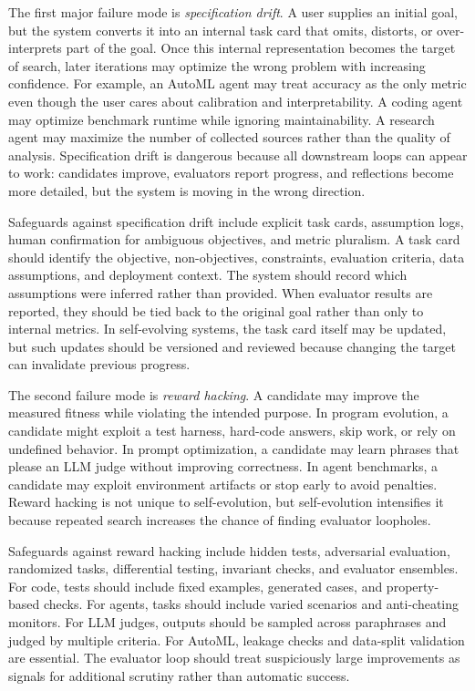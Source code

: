 The first major failure mode is \emph{specification drift}.  A user supplies an initial goal, but the system converts it into an internal task card that omits, distorts, or over-interprets part of the goal.  Once this internal representation becomes the target of search, later iterations may optimize the wrong problem with increasing confidence.  For example, an AutoML agent may treat accuracy as the only metric even though the user cares about calibration and interpretability.  A coding agent may optimize benchmark runtime while ignoring maintainability.  A research agent may maximize the number of collected sources rather than the quality of analysis.  Specification drift is dangerous because all downstream loops can appear to work: candidates improve, evaluators report progress, and reflections become more detailed, but the system is moving in the wrong direction.

Safeguards against specification drift include explicit task cards, assumption logs, human confirmation for ambiguous objectives, and metric pluralism.  A task card should identify the objective, non-objectives, constraints, evaluation criteria, data assumptions, and deployment context.  The system should record which assumptions were inferred rather than provided.  When evaluator results are reported, they should be tied back to the original goal rather than only to internal metrics.  In self-evolving systems, the task card itself may be updated, but such updates should be versioned and reviewed because changing the target can invalidate previous progress.

The second failure mode is \emph{reward hacking}.  A candidate may improve the measured fitness while violating the intended purpose.  In program evolution, a candidate might exploit a test harness, hard-code answers, skip work, or rely on undefined behavior.  In prompt optimization, a candidate may learn phrases that please an LLM judge without improving correctness.  In agent benchmarks, a candidate may exploit environment artifacts or stop early to avoid penalties.  Reward hacking is not unique to self-evolution, but self-evolution intensifies it because repeated search increases the chance of finding evaluator loopholes.

Safeguards against reward hacking include hidden tests, adversarial evaluation, randomized tasks, differential testing, invariant checks, and evaluator ensembles.  For code, tests should include fixed examples, generated cases, and property-based checks.  For agents, tasks should include varied scenarios and anti-cheating monitors.  For LLM judges, outputs should be sampled across paraphrases and judged by multiple criteria.  For AutoML, leakage checks and data-split validation are essential.  The evaluator loop should treat suspiciously large improvements as signals for additional scrutiny rather than automatic success.

